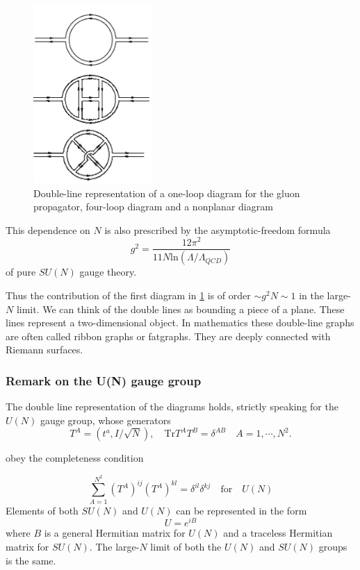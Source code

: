 \begin{figure}
\includegraphics[width=0.4\textwidth]{Images/figurefull.png}
\caption{Double-line representation of a one-loop diagram for the gluon
propagator, four-loop diagram and a nonplanar diagram}
\label{fig:nonplanardiagrams}
\end{figure}
This dependence on $N$ is also prescribed by the asymptotic-freedom formula
\begin{equation}
  g^2 = \frac{12\pi^2}{11N \textrm{ln}(\Lambda/\Lambda_{QCD})}
\end{equation}
of pure $SU(N)$ gauge theory.
\par Thus the contribution of the first diagram in \ref{fig:nonplanardiagrams}
is of order $\sim g^2N\sim 1$ in the large-$N$ limit.
We can think of the double lines as bounding a piece of a plane. These lines
represent a two-dimensional object. In mathematics these double-line graphs are
often called ribbon graphs or fatgraphs. They are deeply connected with Riemann
surfaces.
\subsubsection{Remark on the U(N) gauge group}
The double line representation of the diagrams holds, strictly speaking for the
$U(N)$ gauge group, whose generators
\begin{equation}
  T^A = (t^a, I/\sqrt{N}),\quad \mathrm{Tr}T^AT^B
  = \delta^{AB}\quad\boxed{A=1,\cdots,N^2}.
\end{equation}

obey the completeness condition

\begin{equation}
  \sum_{A=1}^{N^2}(T^A)^{ij}(T^A)^{kl}
  = \delta^{il}\delta^{kj}\quad\boxed{\mathrm{for}\quad U(N)}
\end{equation}
Elements of both $SU(N)$ and $U(N)$ can be represented in the form
\begin{equation}
  U = e^{iB}
\end{equation}
where $B$ is a general Hermitian matrix for $U(N)$ and a traceless Hermitian
matrix for $SU(N)$. The large-$N$ limit of both the $U(N)$ and $SU(N)$ groups
is the same.
